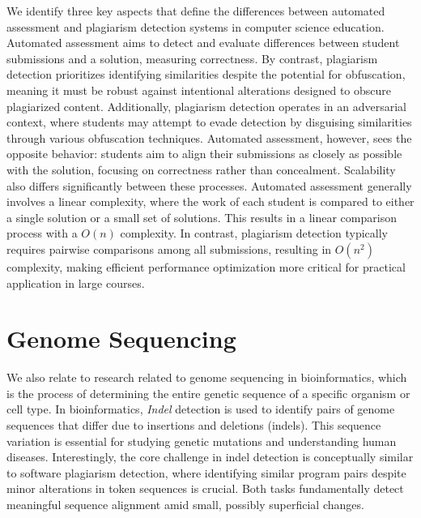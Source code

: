 We identify three key aspects that define the differences between automated assessment and plagiarism detection systems in computer science education. Automated assessment aims to detect and evaluate differences between student submissions and a solution, measuring correctness. By contrast, plagiarism detection prioritizes identifying similarities despite the potential for obfuscation, meaning it must be robust against intentional alterations designed to obscure plagiarized content.
%
Additionally, plagiarism detection operates in an adversarial context, where students may attempt to evade detection by disguising similarities through various obfuscation techniques. Automated assessment, however, sees the opposite behavior: students aim to align their submissions as closely as possible with the solution, focusing on correctness rather than concealment.
%
Scalability also differs significantly between these processes. Automated assessment generally involves a linear complexity, where the work of each student is compared to either a single solution or a small set of solutions. This results in a linear comparison process with a $O(n)$ complexity. In contrast, plagiarism detection typically requires pairwise comparisons among all submissions, resulting in $O(n^2)$ complexity, making efficient performance optimization more critical for practical application in large courses.

\section{Genome Sequencing}\label{sec:rw-genome} %
We also relate to research related to genome sequencing in bioinformatics, which is the process of determining the entire genetic sequence of a specific organism or cell type.
%
In bioinformatics, \textit{Indel} detection is used to identify pairs of genome sequences that differ due to insertions and deletions (indels). This sequence variation is essential for studying genetic mutations and understanding human diseases. Interestingly, the core challenge in indel detection is conceptually similar to software plagiarism detection, where identifying similar program pairs despite minor alterations in token sequences is crucial. Both tasks fundamentally detect meaningful sequence alignment amid small, possibly superficial changes.

